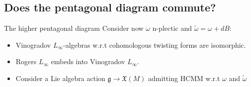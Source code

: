 \documentclass[10pt]{beamer}
\begin{document}
\subsection{Does the pentagonal \textbf{diagram commute}?}
\subcheckpoint	


\begin{frame}{The higher pentagonal diagram}
	Consider now $\omega$ \alert{n-plectic} \quad and \quad \alert{$\tilde{\omega}=\omega + d B$}:
	\vfill
	\only<2->{\vspace{-2em}}
	\begin{center}
		
	\end{center}	
	\vfill
	\begin{itemize}
		\item<2-> Vinogradov $L_\infty$-algebras w.r.t cohomologous twisting forms are isomorphic.
		\item<2-> Rogers $L_\infty$ embeds into Vinogradov $L_\infty$.
		\item<3-> Consider a Lie algebra action $\mathfrak{g}\to \mathfrak{X}(M)$ admitting HCMM w.r.t $\omega$ and $\tilde{\omega}$
	\end{itemize}

	\vfill
	\hfill {}

\end{frame}
\end{document}
